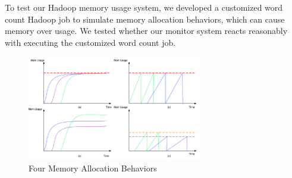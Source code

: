 To test our Hadoop memory usage system, we developed a customized word count Hadoop job to simulate memory allocation behaviors, which can cause memory over usage. We tested whether our monitor system reacts reasonably with executing the customized word count job.  

\begin{figure}[ht]
  \centering
    \includegraphics[width=3.0in]{image/workload.png}
    \caption{Four Memory Allocation Behaviors}
    \label{ref:memory_allocation}
\end{figure}

